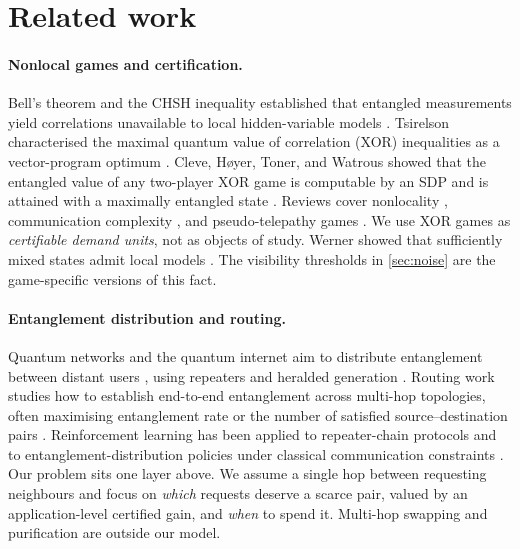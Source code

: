 \documentclass[11pt,a4paper]{article}
\begin{document}
\section{Related work}\label{sec:related}

\paragraph{Nonlocal games and certification.} Bell's theorem and the CHSH inequality established that entangled measurements yield correlations unavailable to local hidden-variable models \cite{bell1964einstein,clauser1969proposed}. Tsirelson characterised the maximal quantum value of correlation (XOR) inequalities as a vector-program optimum \cite{tsirelson1980quantum}. Cleve, H{\o}yer, Toner, and Watrous showed that the entangled value of any two-player XOR game is computable by an SDP and is attained with a maximally entangled state \cite{cleve2004consequences}. Reviews cover nonlocality \cite{brunner2014bell}, communication complexity \cite{buhrman2010nonlocality}, and pseudo-telepathy games \cite{brassard2005quantum}. We use XOR games as \emph{certifiable demand units}, not as objects of study. Werner showed that sufficiently mixed states admit local models \cite{werner1989quantum}. The visibility thresholds in \cref{sec:noise} are the game-specific versions of this fact.

\paragraph{Entanglement distribution and routing.} Quantum networks and the quantum internet aim to distribute entanglement between distant users \cite{kimble2008quantum,wehner2018quantum}, using repeaters \cite{briegel1998quantum} and heralded generation \cite{bernien2013heralded,hensen2015loophole}. Routing work studies how to establish end-to-end entanglement across multi-hop topologies, often maximising entanglement rate or the number of satisfied source--destination pairs \cite{pant2019routing,shi2020concurrent}. Reinforcement learning has been applied to repeater-chain protocols and to entanglement-distribution policies under classical communication constraints \cite{haldar2023fast,li2024optimising}. Our problem sits one layer above. We assume a single hop between requesting neighbours and focus on \emph{which} requests deserve a scarce pair, valued by an application-level certified gain, and \emph{when} to spend it. Multi-hop swapping and purification are outside our model.
\end{document}
